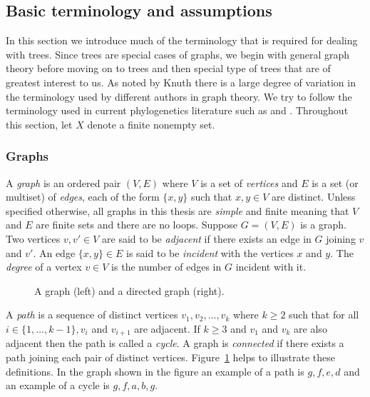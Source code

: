 \subsection{Basic terminology and assumptions}
\label{sec:basic-term-assumpt}

In this section we introduce much of the terminology that is required for
dealing with trees.  Since trees are special cases of graphs, we begin with
general graph theory before moving on to trees and then special type of trees
that are of greatest interest to us.  As noted by Knuth \cite{knuth97taocp1}
there is a large degree of variation in the terminology used by different
authors in graph theory.  We try to follow the terminology used in current
phylogenetics literature such as \cite{semple2003phylogenetics} and
\cite{DHS11}.  Throughout this section, let $X$ denote a finite nonempty set.

\subsubsection{Graphs}
\label{sec:graphs}

A \textit{graph} is an ordered pair $(V,E)$ where $V$ is a set of
\textit{vertices} and $E$ is a set (or multiset) of \textit{edges}, each of
the form $\{x,y\}$ such that $x,y \in V$ are distinct.  Unless specified
otherwise, all graphs in this thesis are \textit{simple} and finite meaning
that $V$ and $E$ are finite sets and there are no loops.  Suppose $G = (V,E)$
is a graph. Two vertices $v,v' \in V$ are said to be \textit{adjacent} if
there exists an edge in $G$ joining $v$ and $v'$.  An edge $\{x,y\} \in E$ is
said to be \textit{incident} with the vertices $x$ and $y$.  The
\textit{degree} of a vertex $v \in V$ is the number of edges in $G$ incident
with it.

\begin{figure}
  \centering
  
  \caption{A graph (left) and a directed graph (right).}
  \label{fig:graph-ex}
\end{figure}

A \textit{path} is a sequence of distinct vertices $v_1,v_2,\dotsc,v_k$ where
$k \geq 2$ such that for all $i \in \{1,\dotsc,k-1\}, v_i$ and $v_{i+1}$ are
adjacent.  If $k \geq 3$ and $v_1$ and $v_k$ are also adjacent then the path
is called a \textit{cycle}.  A graph is \textit{connected} if there exists a
path joining each pair of distinct vertices.  Figure~\ref{fig:graph-ex} helps
to illustrate these definitions.  In the graph shown in the figure an example
of a path is $g,f,e,d$ and an example of a cycle is $g,f,a,b,g$.

